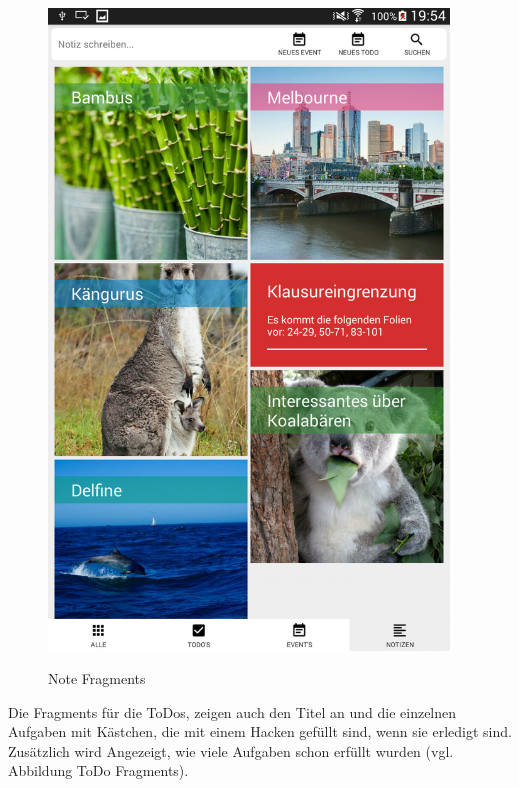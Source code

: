 \begin{figure}[H]
\centering
\begin{minipage}[t]{1\textwidth} %
\caption{Note Fragments} %
\includegraphics[height=17cm]{img/FragmentN}\\ %
\end{minipage}
\end{figure}

Die Fragments für die ToDos, zeigen auch den Titel an und die einzelnen Aufgaben mit Kästchen, die mit einem Hacken gefüllt sind, wenn sie erledigt sind. Zusätzlich wird Angezeigt, wie viele Aufgaben schon erfüllt wurden (vgl. Abbildung ToDo Fragments).

